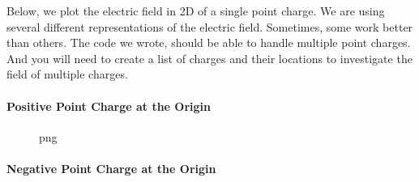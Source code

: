 Below, we plot the electric field in 2D of a single point charge. We are
using several different representations of the electric field.
Sometimes, some work better than others. The code we wrote, should be
able to handle multiple point charges. And you will need to create a
list of charges and their locations to investigate the field of multiple
charges.

\paragraph{Positive Point Charge at the
Origin}\label{positive-point-charge-at-the-origin}

\begin{Shaded}
\begin{Highlighting}[]
\OperatorTok{=}\OperatorTok{{-}}\NormalTok{, }\NormalTok{, }\NormalTok{)}
\OperatorTok{=}\OperatorTok{{-}}\NormalTok{, }\NormalTok{, }\NormalTok{)}
\OperatorTok{=}

\OperatorTok{=}   

\OperatorTok{=}
\end{Highlighting}
\end{Shaded}

\begin{figure}
\centering
{}
\caption{png}
\end{figure}

\paragraph{Negative Point Charge at the
Origin}\label{negative-point-charge-at-the-origin}


